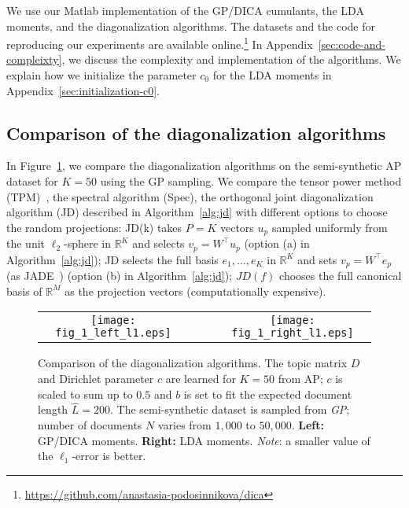 \documentclass{article}
\newcommand{\emp}[1]{\textbf{#1}}
\newcommand{\wh}[1]{\widehat{#1}}
\newcommand{\rr}[1]{\mathbb{R}^{#1}}
\begin{document}
We use our Matlab implementation of the GP/DICA cumulants, the LDA moments, and the diagonalization algorithms. The datasets and the code for reproducing our experiments are available online.\footnote{ \url{https://github.com/anastasia-podosinnikova/dica}} In Appendix~\ref{sec:code-and-compleixty}, we discuss the complexity and implementation of the algorithms.
We explain how we initialize the parameter $c_0$ for the LDA moments in Appendix~\ref{sec:initialization-c0}.













\subsection{Comparison of the diagonalization algorithms}\label{sec:diagcmp}
In Figure~\ref{plots:diag}, we compare the diagonalization algorithms on the semi-synthetic AP dataset for $K=50$ using the GP  sampling. We compare the tensor power method (TPM)~\cite{AnaEtAl2014}, the spectral algorithm (Spec), the orthogonal joint diagonalization algorithm (JD) described in Algorithm~\ref{alg:jd} with different options to choose the random projections:
JD(k) takes $P=K$ vectors $u_p$ sampled uniformly from the unit $\ell_2$-sphere in $\rr{K}$ and selects $v_p = W^{\top} u_p$ (option (a) in Algorithm~\ref{alg:jd}); JD selects the full basis $e_1,\dots,e_K$ in $\rr{K}$ and sets $v_p = W^{\top} e_p$ (as JADE~\cite{CarSou1993}) (option (b) in Algorithm~\ref{alg:jd}); $JD(f)$ chooses the full canonical basis of $\rr{M}$ as the projection vectors (computationally expensive). 
\begin{figure}[t]
\centering
\begin{tabular}{cccc}
\texttt{[image: fig\_1\_left\_l1.eps]} 
 & 
 
 &
 
 &
\texttt{[image: fig\_1\_right\_l1.eps]} 
\end{tabular}
\vspace{-1em}
\caption{
Comparison of the diagonalization algorithms. 
The topic matrix $D$ and Dirichlet parameter $c$ are learned for $K=50$ from AP; $c$ is scaled to sum up to $0.5$ 
and $b$ is set to fit the expected document length $\wh{L}=200$. The semi-synthetic dataset is sampled from \textit{GP}; number of documents $N$ varies from $1,000$ to $50,000$. \emp{Left:} GP/DICA moments. \emp{Right:} LDA moments.  \textit{Note}: a smaller value of the $\ell_1$-error is better. 
}
\label{plots:diag}
\vspace{-1.5em}
\end{figure}
\end{document}

